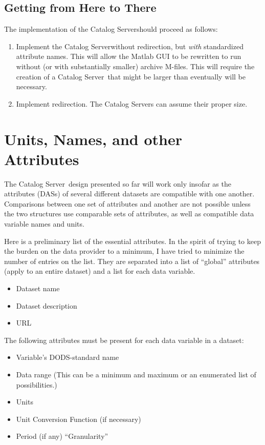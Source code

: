\documentclass[10pt]{report}
\newcommand{\cs}{Catalog Server}
\begin{document}
\cbstart

\section{Getting from Here to There}
\label{sec:getting}

The implementation of the \cs should proceed as follows:

\begin{enumerate}
\item Implement the \cs without redirection, but \emph{with}
  standardized attribute names.  This will allow the Matlab GUI to be
  rewritten to run without (or with substantially smaller) archive
  M-files.  This will require the creation of a \cs\ that might be
  larger than eventually will be necessary.
\item Implement redirection.  The \cs s can assume their proper size.
\end{enumerate}

\cbend

\chapter{Units, Names, and other Attributes}
\label{sec:attr}

The \cs\ design presented so far will work only insofar as the
attributes (DASs) of several different datasets are compatible with
one another.  Comparisons between one set of attributes and another
are not possible unless the two structures use comparable sets of
attributes, as well as compatible data variable names and units.

Here is a preliminary list of the essential attributes.  In the spirit
of trying to keep the burden on the data provider to a minimum, I have
tried to minimize the number of entries on the list.  They are
separated into a list of ``global'' attributes (apply to an entire
dataset) and a list for each data variable.

\begin{itemize}
\item Dataset name
\item Dataset description
\item URL
\end{itemize}

\noindent The following attributes must be present for each data variable in a
dataset: 

\begin{itemize}
\item Variable's DODS-standard name
\item Data range (This can be a minimum and maximum or an enumerated
  list of possibilities.)
\item Units
\item Unit Conversion Function (if necessary)
\item Period (if any) ``Granularity''
\end{itemize}
\end{document}
